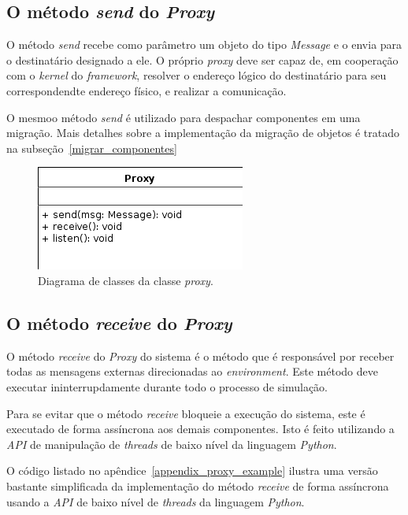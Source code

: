 \subsection{O método \emph{send} do \emph{Proxy}}

O método \textit{send} recebe como parâmetro um objeto do tipo \textit{Message} e o envia para o destinatário designado a ele. O próprio \textit{proxy} deve ser capaz de, em cooperação com o \textit{kernel} do \textit{framework}, resolver o endereço lógico do destinatário para seu correspondendte endereço físico, e realizar a comunicação.

O mesmoo método \textit{send} é utilizado para despachar componentes em uma migração. Mais detalhes sobre a implementação da migração de objetos é tratado na subseção~\ref{migrar_componentes}

\begin{figure}
  \centerline{\includegraphics{uml_proxy_basico.png}}
  \caption{Diagrama de classes da classe \textit{proxy}.}
\label{fig:uml_proxy_basico}
\end{figure}

\subsection{O método \emph{receive} do \emph{Proxy}}

O método \textit{receive} do \textit{Proxy} do sistema é o método que é responsável por receber todas as mensagens externas direcionadas ao \textit{environment}. Este método deve executar ininterrupdamente durante todo o processo de simulação.

Para se evitar que o método \textit{receive} bloqueie a execução do sistema, este é executado de forma assíncrona aos demais componentes. Isto é feito utilizando a \textit{API} de manipulação de \textit{threads} de baixo nível da linguagem \textit{Python}.

O código listado no apêndice~\ref{appendix_proxy_example} ilustra uma versão bastante simplificada da implementação do método \textit{receive} de forma assíncrona usando a \textit{API} de baixo nível de \textit{threads} da linguagem \textit{Python}.

